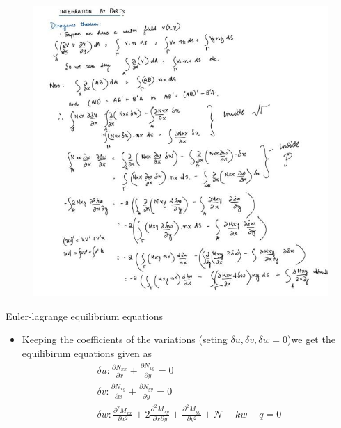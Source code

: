 	\begin{frame}
		\begin{figure}
			\centering
			\includegraphics[width=0.7 \linewidth]{Figure/fig34} 		
		\end{figure}
	\end{frame}


	\begin{frame}{Euler-lagrange equilibrium equations}
		\begin{itemize}
			\item Keeping the coefficients of the variations (seting $\delta u, \delta v, \delta w = 0$)we get the equilibirum equations given as
			\begin{equation}
			\begin{aligned}
				\delta u : \frac{\partial N_{xx}}{\partial x} + \frac{\partial N_{xy}}{\partial y} = 0\\
				\delta v : \frac{\partial N_{xy}}{\partial x} + \frac{\partial N_{yy}}{\partial y} = 0\\
				\delta w : \frac{\partial^2 M_{xx}}{\partial x^2} + 2\frac{\partial^2 M_{xy}}{\partial x \partial y} + \frac{\partial^2 M_{yy}}{\partial y^2} + \mathcal{N} - kw + q = 0
			\end{aligned}
			\end{equation}
		\end{itemize}
	\end{frame}


